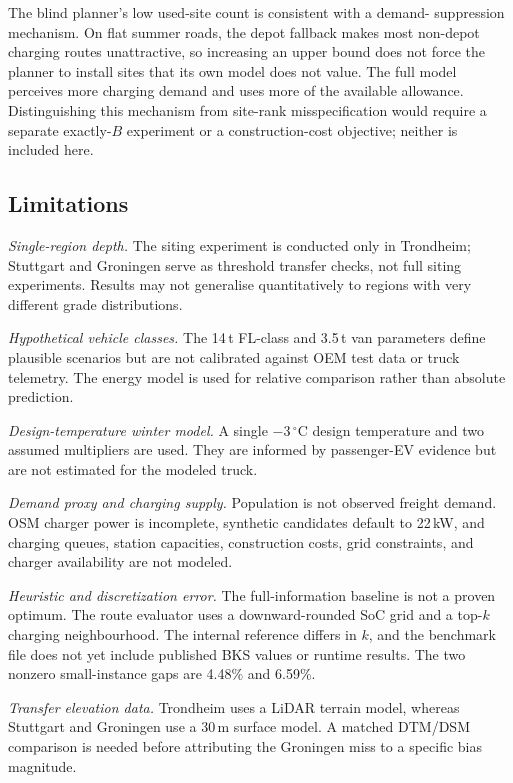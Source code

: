 \documentclass[review,3p,authoryear]{elsarticle}
\begin{document}
The blind planner's low used-site count is consistent with a demand-
suppression mechanism.  On flat summer roads, the depot fallback makes most
non-depot charging routes unattractive, so increasing an upper bound does
not force the planner to install sites that its own model does not value.
The full model perceives more charging demand and uses more of the available
allowance.  Distinguishing this mechanism from site-rank misspecification
would require a separate exactly-$B$ experiment or a construction-cost
objective; neither is included here.

\subsection{Limitations}
\label{sec:limitations}

\emph{Single-region depth.}  The siting experiment is conducted only in
Trondheim; Stuttgart and Groningen serve as threshold transfer checks, not
full siting experiments.  Results may not generalise quantitatively to
regions with very different grade distributions.

\emph{Hypothetical vehicle classes.}  The 14\,t FL-class and 3.5\,t van
parameters define plausible scenarios but are not calibrated against OEM
test data or truck telemetry.  The energy model is used for relative
comparison rather than absolute prediction.

\emph{Design-temperature winter model.}  A single $-3\,^{\circ}$C design
temperature and two assumed multipliers are used.  They are informed by
passenger-EV evidence but are not estimated for the modeled truck.

\emph{Demand proxy and charging supply.}  Population is not observed freight
demand.  OSM charger power is incomplete, synthetic candidates default to
22\,kW, and charging queues, station capacities, construction costs, grid
constraints, and charger availability are not modeled.

\emph{Heuristic and discretization error.}  The full-information baseline is
not a proven optimum.  The route evaluator uses a downward-rounded SoC grid
and a top-$k$ charging neighbourhood.  The internal reference differs in
$k$, and the benchmark file does not yet include published BKS values or
runtime results.  The two nonzero small-instance gaps are 4.48\% and 6.59\%.

\emph{Transfer elevation data.}  Trondheim uses a LiDAR terrain model,
whereas Stuttgart and Groningen use a 30\,m surface model.  A matched
DTM/DSM comparison is needed before attributing the Groningen miss to a
specific bias magnitude.
\end{document}
